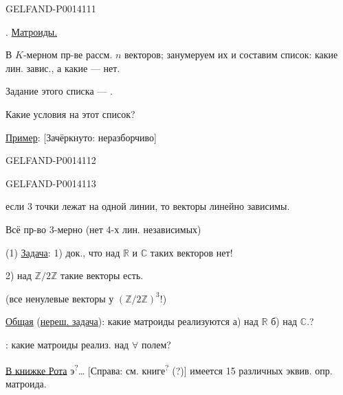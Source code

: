 \begin{GelfandAdjacentEvidence}{GELFAND-P001411}{1}

. \uline{Матроиды.}

В \(K\)-мерном пр-ве рассм. \(n\) векторов;
занумеруем их и составим список: какие лин. завис., а какие — нет.

Задание этого списка — .

Какие условия на этот список?

\uline{Пример}:
[Зачёркнуто: неразборчиво]
\end{GelfandAdjacentEvidence}
\begin{GelfandAdjacentEvidence}{GELFAND-P001411}{2}


\end{GelfandAdjacentEvidence}
\begin{GelfandAdjacentEvidence}{GELFAND-P001411}{3}


если 3 точки лежат на одной линии, то векторы линейно зависимы.

Всё пр-во 3-мерно (нет 4-х лин. независимых)

(1) \uline{Задача}: 1) док., что над \(\mathbb R\) и \(\mathbb C\)
таких векторов нет!

2) над \(\mathbb Z/2\mathbb Z\) такие векторы есть.

(все ненулевые векторы у \((\mathbb Z/2\mathbb Z)^3\)!)

\uline{Общая} (\uline{нереш. задача}): какие матроиды реализуются
а) над \(\mathbb R\)
б) над \(\mathbb C\).?

: какие матроиды реализ. над \(\forall\) полем?

\uline{В книжке Рота} э\textsuperscript{?}\ldots
[Справа: см. книге\textsuperscript{?}  (?)]
имеется 15 различных эквив. опр. матроида.

\end{GelfandAdjacentEvidence}

